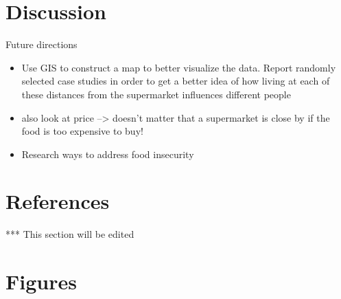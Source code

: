 \documentclass[letterpaper]{article} %
\begin{document}
\section{Discussion}

Future directions
\begin{itemize}\itemsep -.1cm\vspace{-.25cm}
	\item Use GIS to construct a map to better visualize the data. Report randomly selected case studies in order to get a better idea of how living at each of these distances from the supermarket influences different people
	\item also look at price --> doesn't matter that a supermarket is close by if the food is too expensive to buy!
	\item Research ways to address food insecurity
\end{itemize}

\newpage
\section{References}

*** This section will be edited 


\newpage
\section{Figures}
\end{document}
